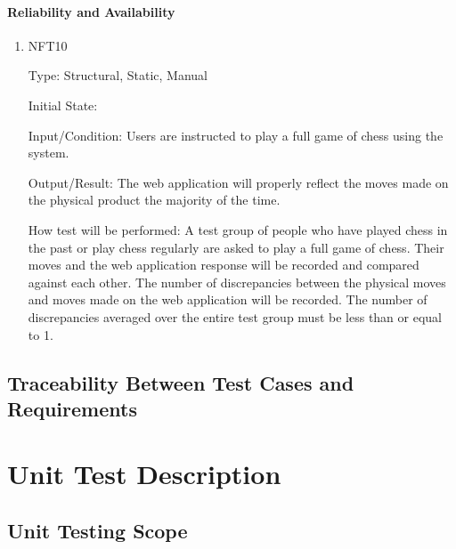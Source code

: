 \documentclass[12pt, titlepage]{article}
\begin{document}
\paragraph{Reliability and Availability}
\begin{enumerate}
    \item{NFT10}

        Type: Structural, Static, Manual
                            
        Initial State: 
                            
        Input/Condition: Users are instructed to play a full game of chess using the \progname{} system.
                            
        Output/Result: The web application will properly reflect the moves made on the physical product the majority of the time.
                            
        How test will be performed: A test group of people who have played chess in the past or play chess regularly are asked to play a full game of chess. 
            Their moves and the web application response will be recorded and compared against each other. The number of discrepancies between the physical 
            moves and moves made on the web application will be recorded. The number of discrepancies averaged over the entire test group must be less than 
            or equal to 1.
\end{enumerate}

\subsection{Traceability Between Test Cases and Requirements}


\section{Unit Test Description}


\subsection{Unit Testing Scope}
\end{document}
